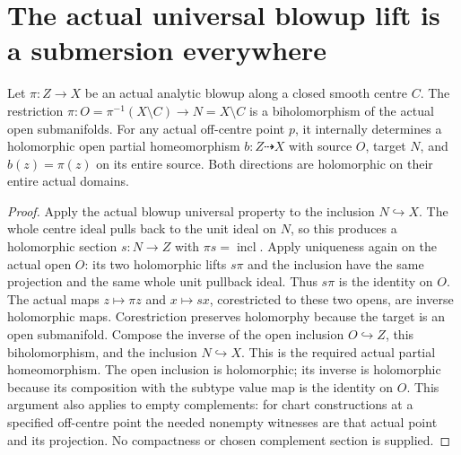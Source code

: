 \section{The actual universal blowup lift is a submersion everywhere}

\begin{lemma}
\label{hir:submersion-blowup-actual-complement-biholomorphism}
\leanok
{}
Let $\pi:Z\to X$ be an actual analytic blowup along a closed smooth centre $C$.
The restriction $\pi:O=\pi^{-1}(X\setminus C)\to N=X\setminus C$ is a
biholomorphism of the actual open submanifolds. For any actual off-centre
point $p$, it internally determines a holomorphic open partial homeomorphism
$b:Z\dashrightarrow X$ with source $O$,
target $N$, and $b(z)=\pi(z)$ on its entire source. Both directions are
holomorphic on their entire actual domains.
\end{lemma}
\begin{proof}
Apply the actual blowup universal property to the inclusion $N\hookrightarrow X$.
The whole centre ideal pulls back to the unit ideal on $N$, so this produces a
holomorphic section $s:N\to Z$ with $\pi s=\operatorname{incl}$. Apply uniqueness
again on the actual open $O$: its two holomorphic lifts $s\pi$ and the inclusion
have the same projection and the same whole unit pullback ideal. Thus $s\pi$
is the identity on $O$. The actual maps $z\mapsto\pi z$ and $x\mapsto s x$,
corestricted to these two opens, are inverse holomorphic maps. Corestriction
preserves holomorphy because the target is an open submanifold. Compose the
inverse of the open inclusion $O\hookrightarrow Z$, this biholomorphism, and
the inclusion $N\hookrightarrow X$. This is the required actual partial
homeomorphism. The open inclusion is holomorphic; its inverse is holomorphic
because its composition with the subtype value map is the identity on $O$.
This argument also applies to empty complements: for chart constructions at a
specified off-centre point the needed nonempty witnesses are that actual point
and its projection. No compactness or chosen complement section is supplied.
\end{proof}

